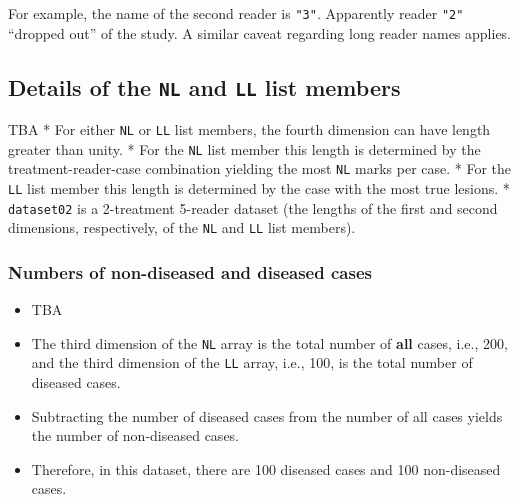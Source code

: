 \documentclass[]{book}
\newenvironment{Shaded}{\begin{snugshade}}{\end{snugshade}}
\newcommand{\CommentTok}[1]{\textcolor[rgb]{0.56,0.35,0.01}{\textit{#1}}}
\newcommand{\DecValTok}[1]{\textcolor[rgb]{0.00,0.00,0.81}{#1}}
\newcommand{\KeywordTok}[1]{\textcolor[rgb]{0.13,0.29,0.53}{\textbf{#1}}}
\newcommand{\NormalTok}[1]{#1}
\newcommand{\OperatorTok}[1]{\textcolor[rgb]{0.81,0.36,0.00}{\textbf{#1}}}
\providecommand{\tightlist}{%
  \setlength{\itemsep}{0pt}\setlength{\parskip}{0pt}}
\begin{document}
For example, the name of the second reader is \texttt{"3"}. Apparently reader \texttt{"2"} ``dropped out'' of the study. A similar caveat regarding long reader names applies.

\hypertarget{details-of-the-nl-and-ll-list-members-1}{%
\subsection{\texorpdfstring{Details of the \texttt{NL} and \texttt{LL} list members}{Details of the NL and LL list members}}\label{details-of-the-nl-and-ll-list-members-1}}

TBA
* For either \texttt{NL} or \texttt{LL} list members, the fourth dimension can have length greater than unity.
* For the \texttt{NL} list member this length is determined by the treatment-reader-case combination yielding the most \texttt{NL} marks per case.
* For the \texttt{LL} list member this length is determined by the case with the most true lesions.
* \texttt{dataset02} is a 2-treatment 5-reader dataset (the lengths of the first and second dimensions, respectively, of the \texttt{NL} and \texttt{LL} list members).

\hypertarget{numbers-of-non-diseased-and-diseased-cases-1}{%
\subsubsection{Numbers of non-diseased and diseased cases}\label{numbers-of-non-diseased-and-diseased-cases-1}}

\begin{itemize}
\tightlist
\item
  TBA
\end{itemize}

\begin{Shaded}
\end{Shaded}

\begin{itemize}
\item
  The third dimension of the \texttt{NL} array is the total number of \textbf{all} cases, i.e., 200, and the third dimension of the \texttt{LL} array, i.e., 100, is the total number of diseased cases.
\item
  Subtracting the number of diseased cases from the number of all cases yields the number of non-diseased cases.
\item
  Therefore, in this dataset, there are 100 diseased cases and 100 non-diseased cases.
\end{itemize}
\end{document}
